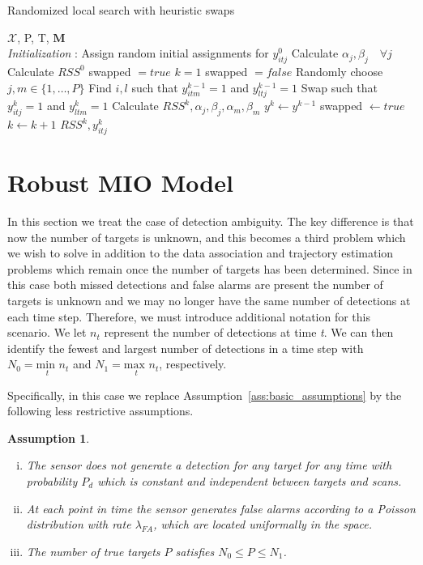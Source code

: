 \documentclass[journal]{IEEEtran}
\newtheorem{assumption}{Assumption}
\begin{document}
\begin{algorithm}
 \caption{Randomized local search with heuristic swaps}
 \begin{algorithmic}[1]
 \renewcommand{\algorithmicrequire}{\textbf{Input:}}
 \REQUIRE $\boldsymbol{\mathcal{X}}$, P, T, $\boldsymbol{M}$
 \\ \textit{Initialization} : Assign random initial assignments for $y^{0}_{itj}$
  \STATE Calculate $\alpha_{j}, \beta_{j} \quad \forall j $
  \STATE Calculate $RSS^{0}$
  \STATE swapped $= true$
  \STATE $ k=1 $
  \STATE swapped $= false$
  \STATE Randomly choose $j,m\in\{1,\ldots,P\}$
  \STATE Find $i,l$ such that $y^{k-1}_{itm}=1$ and $y^{k-1}_{ltj}=1$
  \STATE Swap such that $y^{k}_{itj}=1$ and $y^{k}_{ltm}=1$
  \STATE Calculate $RSS^{k}, \alpha_{j}, \beta_{j}, \alpha_{m}, \beta_{m}$
  \STATE $y^{k} \leftarrow y^{k-1}$
  \ELSE 
  \STATE swapped $\leftarrow true$
  \ENDIF
  \ENDFOR
  \STATE $ k \leftarrow k + 1 $
  \ENDWHILE
 \RETURN $RSS^{k}, y^{k}_{itj}$ 
 \end{algorithmic} 
 \end{algorithm}

\section{Robust MIO Model}
In this section we treat the case of detection ambiguity. The key difference is that now the number of targets is unknown, and this becomes a third problem which we wish to solve in addition to the data association and trajectory estimation problems which remain once the number of targets has been determined. Since in this case both missed detections and false alarms are present the number of targets is unknown and we may no longer have the same number of detections at each time step. Therefore, we must introduce additional notation for this scenario. We let $n_{t}$ represent  the number of detections at time \textit{t}. We can then identify the fewest and largest number of detections in a time step with $N_{0} = \underset{t}{\text{min }} n_{t}$ and $N_{1} = \underset{t}{\text{max }}  n_{t}$, respectively. 

Specifically, in this case we replace Assumption~\ref{ass:basic_assumptions} by the following less restrictive assumptions.
\begin{assumption}\label{ass:robust_assumptions}
\begin{enumerate}[(i)]
\item The sensor does not generate a detection for any target for any time with probability $P_{d}$ which is constant and independent between targets and scans.
\item At each point in time the sensor generates false alarms according to a Poisson distribution with rate $\lambda_{FA}$, which are located uniformally in the space.
\item The number of true targets $P$ satisfies $N_0\leq P \leq N_1$.
\end{enumerate}
\end{assumption}
\end{document}
